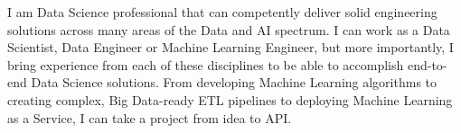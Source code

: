 I am Data Science professional that can competently deliver solid engineering solutions across many areas of the Data and AI spectrum. I can work as a Data Scientist, Data Engineer or Machine Learning Engineer, but more importantly, I bring experience from each of these disciplines to be able to accomplish end-to-end Data Science solutions. From developing Machine Learning algorithms to creating complex, Big Data-ready ETL pipelines to deploying Machine Learning as a Service, I can take a project from idea to API.